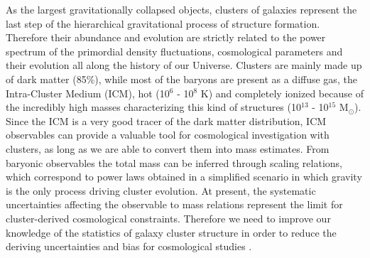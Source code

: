 \documentclass[11pt,a4paper,twoside,graphicx,color]{article}
\begin{document}
\vspace{-0.1cm} 
As the largest gravitationally collapsed objects, clusters of galaxies represent the last step of the hierarchical gravitational process of structure formation. Therefore their abundance and evolution are strictly related to the power spectrum of the primordial density fluctuations, cosmological parameters and their evolution all along the history of our Universe. 
Clusters are mainly made up of dark matter (85\%), while most of the baryons are present as a diffuse gas, the Intra-Cluster Medium (ICM), hot (10$^6$ - 10$^8$ K) and completely ionized because of the incredibly high masses characterizing this kind of structures (10$^{13}$ - 10$^{15}$ M$_{\odot}$). Since the ICM is a very good tracer of the dark matter distribution, ICM observables can provide a valuable tool for cosmological investigation with clusters, as long as we are able to convert them into mass estimates. From baryonic observables the total mass can be inferred through scaling relations, which correspond to power laws obtained in a simplified scenario in which gravity is the only process driving cluster evolution. At present, the systematic uncertainties affecting the observable to mass relations represent the limit for cluster-derived cosmological constraints. Therefore we need to improve our knowledge of the statistics of galaxy cluster structure in order to reduce the deriving uncertainties and bias for cosmological studies \citep[e.g.][]{number_counts2015, ymap}.
\end{document}
